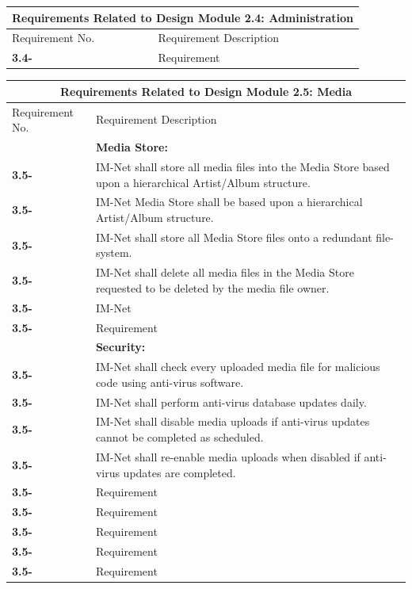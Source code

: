\documentclass[letterpaper,12pt]{article}
\newcounter{rcounter}						%
\newcommand\rnumber{\stepcounter{rcounter}\arabic{rcounter}}
\begin{document}
{\setcounter{rcounter}{0}
\begin{center}
\begin{tabular}{|l|p{6in}|}
\hline 
\multicolumn{2}{|c|}{\textbf{Requirements Related to Design Module 2.4: Administration}} \\ 
\hline 
Requirement No. & Requirement Description \\ 
\hline
\textbf{3.4-\rnumber} & Requirement \\ 
\hline 
\end{tabular} 
\end{center}

\setcounter{rcounter}{0}
\begin{center}
\begin{tabular}{|l|p{6in}|}
\hline 
\multicolumn{2}{|c|}{\textbf{Requirements Related to Design Module 2.5: Media}} \\ 
\hline 
Requirement No. & Requirement Description \\
\hline
& \textbf{Media Store:} \\
\hline
\textbf{3.5-\rnumber} & IM-Net shall store all media files into the Media Store based upon a hierarchical Artist/Album structure. \\ 
\hline
\textbf{3.5-\rnumber} & IM-Net Media Store shall be based upon a hierarchical Artist/Album structure. \\ 
\hline
\textbf{3.5-\rnumber} & IM-Net shall store all Media Store files onto a redundant file-system. \\ 
\hline
\textbf{3.5-\rnumber} & IM-Net shall delete all media files in the Media Store requested to be deleted by the media file owner. \\ 
\hline
\textbf{3.5-\rnumber} & IM-Net  \\ 
\hline
\textbf{3.5-\rnumber} & Requirement \\ 
\hline
& \textbf{Security:} \\
\hline
\textbf{3.5-\rnumber} & IM-Net shall check every uploaded media file for malicious code using anti-virus software. \\ 
\hline
\textbf{3.5-\rnumber} & IM-Net shall perform anti-virus database updates daily.\\ 
\hline
\textbf{3.5-\rnumber} & IM-Net shall disable media uploads if anti-virus updates cannot be completed as scheduled. \\ 
\hline 
\textbf{3.5-\rnumber} & IM-Net shall re-enable media uploads when disabled if anti-virus updates are completed. \\ 
\hline
\textbf{3.5-\rnumber} & Requirement \\ 
\hline
\textbf{3.5-\rnumber} & Requirement \\ 
\hline
\textbf{3.5-\rnumber} & Requirement \\ 
\hline
\textbf{3.5-\rnumber} & Requirement \\ 
\hline
\textbf{3.5-\rnumber} & Requirement \\ 
\hline
\end{tabular} 
\end{center}

}
\end{document}
